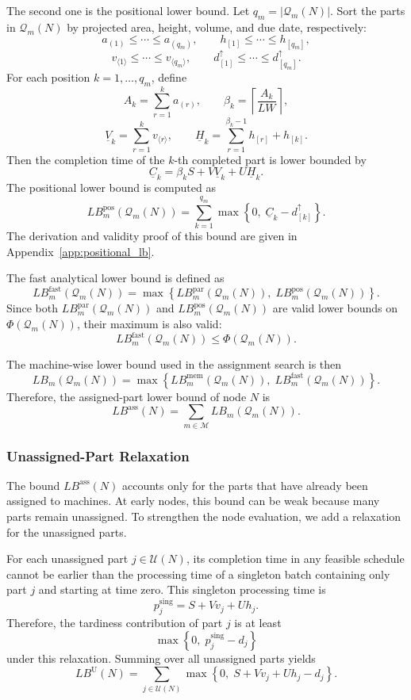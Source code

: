 \documentclass[letterpaper, 10 pt, conference]{ieeeconf}  %
\begin{document}
The second one is the positional lower bound. Let
$q_m=|\mathcal{Q}_m(N)|$. Sort the parts in $\mathcal{Q}_m(N)$ by projected
area, height, volume, and due date, respectively:
\[
a_{(1)} \le \cdots \le a_{(q_m)},\qquad
h_{[1]} \le \cdots \le h_{[q_m]},
\]
\[
v_{\langle 1\rangle} \le \cdots \le v_{\langle q_m\rangle},\qquad
d_{[1]}^{\uparrow} \le \cdots \le d_{[q_m]}^{\uparrow}.
\]
For each position $k=1,\dots,q_m$, define
\[
A_k=\sum_{r=1}^{k}a_{(r)},
\qquad
\beta_k=\left\lceil\frac{A_k}{LW}\right\rceil,
\]
\[
\underline{V}_k=\sum_{r=1}^{k}v_{\langle r\rangle},
\qquad
\underline{H}_k=
\sum_{r=1}^{\beta_k-1}h_{[r]}+h_{[k]}.
\]
Then the completion time of the $k$-th completed part is lower bounded by
\[
\underline{C}_k
=
\beta_k S
+
V\underline{V}_k
+
U\underline{H}_k.
\]
The positional lower bound is computed as
\[
LB_m^{\mathrm{pos}}(\mathcal{Q}_m(N))
=
\sum_{k=1}^{q_m}
\max
\left\{
0,\;
\underline{C}_k-d_{[k]}^{\uparrow}
\right\}.
\]
The derivation and validity proof of this bound are given in
Appendix~\ref{app:positional_lb}.

The fast analytical lower bound is defined as
\[
LB_m^{\mathrm{fast}}(\mathcal{Q}_m(N))
=
\max
\left\{
LB_m^{\mathrm{par}}(\mathcal{Q}_m(N)),
\;
LB_m^{\mathrm{pos}}(\mathcal{Q}_m(N))
\right\}.
\]
Since both $LB_m^{\mathrm{par}}(\mathcal{Q}_m(N))$ and
$LB_m^{\mathrm{pos}}(\mathcal{Q}_m(N))$ are valid lower bounds on
$\Phi(\mathcal{Q}_m(N))$, their maximum is also valid:
\[
LB_m^{\mathrm{fast}}(\mathcal{Q}_m(N))
\le
\Phi(\mathcal{Q}_m(N)).
\]

The machine-wise lower bound used in the assignment search is then
\[
LB_m(\mathcal{Q}_m(N))
=
\max
\left\{
LB_m^{\mathrm{mem}}(\mathcal{Q}_m(N)),
\;
LB_m^{\mathrm{fast}}(\mathcal{Q}_m(N))
\right\}.
\]
Therefore, the assigned-part lower bound of node $N$ is
\[
LB^{\mathrm{ass}}(N)
=
\sum_{m\in\mathcal{M}}
LB_m(\mathcal{Q}_m(N)).
\]

\subsubsection{Unassigned-Part Relaxation}

The bound $LB^{\mathrm{ass}}(N)$ accounts only for the parts that have
already been assigned to machines. At early nodes, this bound can be weak
because many parts remain unassigned. To strengthen the node evaluation, we
add a relaxation for the unassigned parts.

For each unassigned part $j\in\mathcal{U}(N)$, its completion time in any
feasible schedule cannot be earlier than the processing time of a singleton
batch containing only part $j$ and starting at time zero. This singleton
processing time is
\[
p_j^{\mathrm{sing}}
=
S+Vv_j+Uh_j.
\]
Therefore, the tardiness contribution of part $j$ is at least
\[
\max\left\{0,\;p_j^{\mathrm{sing}}-d_j\right\}
\]
under this relaxation. Summing over all unassigned parts yields
\[
LB^{\mathrm{U}}(N)
=
\sum_{j\in\mathcal{U}(N)}
\max\left\{0,\;S+Vv_j+Uh_j-d_j\right\}.
\]
\end{document}
